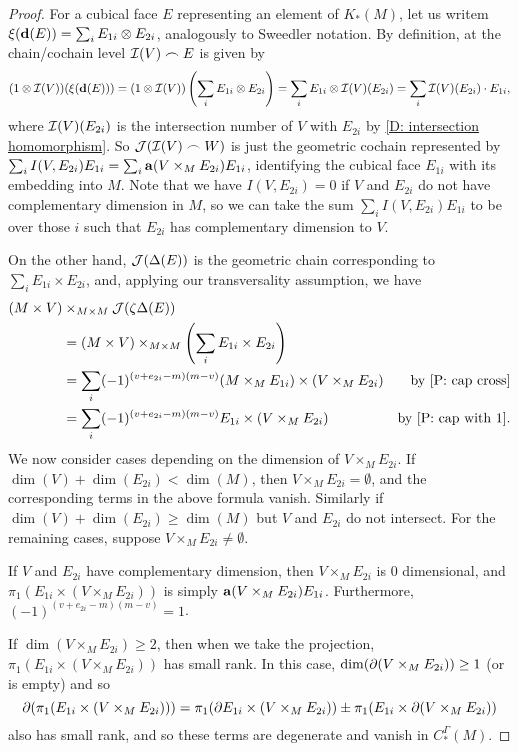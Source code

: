 \begin{proof}
For a cubical face $E$ representing an element of $K_*(M)$, let us writem$\xi(\mathbf{d} (E)) = \sum_i E_{1i}\otimes E_{2i}$, analogously to Sweedler notation. By definition, at the chain/cochain level $\mathcal{I}(V)\frown E$ is given by
$$(1\otimes \mathcal{I}(V))(\xi(\mathbf{d} (E))) = (1\otimes \mathcal{I}(V))\left(\sum_i E_{1i}\otimes E_{2i}\right) = \sum_i E_{1i}\otimes \mathcal{I}(V)(E_{2i}) = \sum_i \mathcal{I}(V)(E_{2i})\cdot E_{1i},$$
where $\mathcal{I}(V)(E_{2i})$ is the intersection number of $V$ with $E_{2i}$ by \cref{D: intersection homomorphism}. So $\mathcal{J}(\mathcal{I}(V)\frown W)$ is just the geometric cochain represented by $\sum_i I(V,E_{2i})E_{1i} = \sum_i \mathbf{a}(V \times_M E_{2i})E_{1i} $, identifying the cubical face $E_{1i}$ with its embedding into $M$. Note that we have $I(V,E_{2i}) = 0$ if $V$ and $E_{2i}$ do not have complementary dimension in $M$, so we can take the sum $\sum_i I(V,E_{2i})E_{1i}$ to be over those $i$ such that $E_{2i}$ has complementary dimension to $V$.

On the other hand, $\mathcal{J}(\Delta(E))$ is the geometric chain corresponding to $\sum_i E_{1i} \times E_{2i}$, and, applying our transversality assumption, we have
\begin{align*}
(M \times V)&\times_{M \times M}\mc J(\zeta\Delta(E))\\
& = (M \times V)\times_{M \times M}\left(\sum_i E_{1i} \times E_{2i}\right)\\
& = \sum_i (-1)^{(v+e_{2i}-m)(m-v)}(M \times_M E_{1i}) \times (V \times_M E_{2i})&\text{by \cref{P: cap cross}}\\
& = \sum_i (-1)^{(v+e_{2i}-m)(m-v)}E_{1i} \times (V \times_M E_{2i})&\text{by \cref{P: cap with 1}}.
\end{align*}
We now consider cases depending on the dimension of $V \times_M E_{2i}$. If $\dim(V)+\dim(E_{2i})<\dim (M)$, then $V \times_M E_{2i} = \emptyset$, and the corresponding terms in the above formula vanish. Similarly if $\dim(V)+\dim(E_{2i})\geq \dim (M)$ but $V$ and $E_{2i}$ do not intersect. For the remaining cases, suppose
$V \times_M E_{2i}\neq \emptyset$.

If $V$ and $E_{2i}$ have complementary dimension, then $V \times_M E_{2i}$ is $0$ dimensional, and $\pi_1(
E_{1i} \times (V \times_M E_{2i}))$ is simply $\mathbf{a}(V \times_M E_{2i})E_{1i}$. Furthermore, $(-1)^{(v+e_{2i}-m)(m-v)} = 1$.

If $\dim(V \times_M E_{2i})\geq 2$, then when we take the projection,
 $\pi_1(E_{1i} \times (V \times_M E_{2i}))$ has small rank. In this case, $\dim(\partial (V \times_M E_{2i}))\geq 1$ (or is empty) and so
$$\partial(\pi_1(E_{1i} \times (V \times_M E_{2i}))) = \pi_1(\partial E_{1i} \times (V \times_M E_{2i}))\pm \pi_1(E_{1i}\times\partial(V \times_M E_{2i}))$$
also has small rank, and so these terms are degenerate and vanish in $C^\Gamma_*(M)$.


\end{proof}
